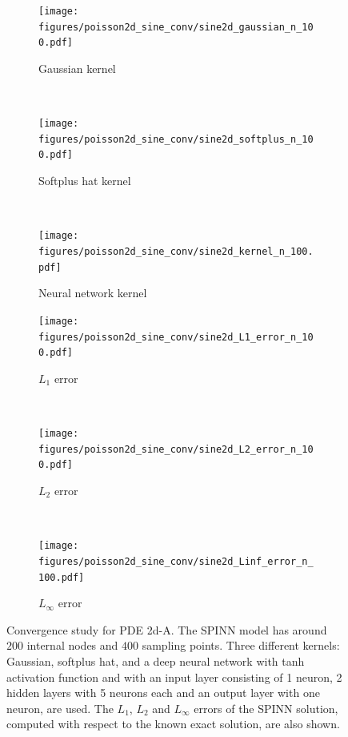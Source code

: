 \documentclass[12pt]{article}
\begin{document}
\begin{figure}
\begin{subfigure}{0.32\textwidth}
\centering
\texttt{[image: figures/poisson2d\_sine\_conv/sine2d\_gaussian\_n\_100.pdf]}
\caption{Gaussian kernel}
\label{fig:2d_A_gaussian_n_100}
\end{subfigure}
~
\begin{subfigure}{0.32\textwidth}
\centering
\texttt{[image: figures/poisson2d\_sine\_conv/sine2d\_softplus\_n\_100.pdf]}
\caption{Softplus hat kernel}
\label{fig:2d_A_softplus_n_100_a}
\end{subfigure}
~
\begin{subfigure}{0.32\textwidth}
\centering
\texttt{[image: figures/poisson2d\_sine\_conv/sine2d\_kernel\_n\_100.pdf]}
\caption{Neural network kernel}
\label{fig:2d_A_kernel_n_100}
\end{subfigure}
\begin{subfigure}{0.32\textwidth}
\centering
\texttt{[image: figures/poisson2d\_sine\_conv/sine2d\_L1\_error\_n\_100.pdf]}
\caption{$L_1$ error}
\label{fig:2d_A_L1_n_100}
\end{subfigure}
~
\begin{subfigure}{0.32\textwidth}
\centering
\texttt{[image: figures/poisson2d\_sine\_conv/sine2d\_L2\_error\_n\_100.pdf]}
\caption{$L_2$ error}
\label{fig:2d_A_L2_n_100}
\end{subfigure}
~
\begin{subfigure}{0.32\textwidth}
\centering
\texttt{[image: figures/poisson2d\_sine\_conv/sine2d\_Linf\_error\_n\_100.pdf]}
\caption{$L_{\infty}$ error}
\label{fig:2d_A_Linf_n_100_a}
\end{subfigure}
\caption{Convergence study for PDE 2d-A. The SPINN model has around $200$ internal nodes and $400$ sampling points. Three different kernels: Gaussian, softplus hat, and a deep neural network with tanh activation function and with an input layer consisting of 1 neuron, 2 hidden layers with 5 neurons each and an output layer with one neuron, are used. The $L_1$, $L_2$ and $L_{\infty}$ errors of the SPINN solution, computed with respect to the known exact solution, are also shown.}
\label{fig:sine2d_conv_activation}
\end{figure}
\end{document}
